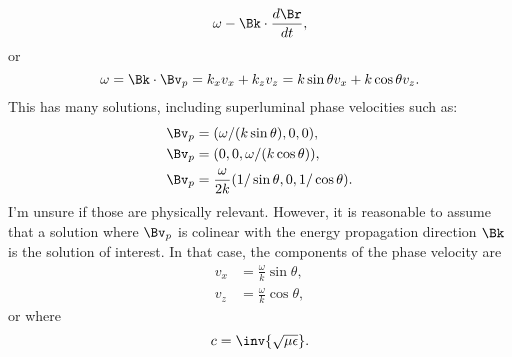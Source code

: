 {{\begin{dmath}
\omega - \Bk \cdot \frac{d\Br}{dt},
\end{dmath}
or
\begin{dmath}\label{eqn:emtproblemSet6Problem3:380}
\omega =
\Bk \cdot \Bv_p
=
k_x v_x
+
k_z v_z
=
k \sin\theta v_x
+
k \cos\theta v_z.
\end{dmath}
This has many solutions, including superluminal phase velocities such as:
\begin{equation}\label{eqn:emtproblemSet6Problem3:420}
\begin{aligned}
\Bv_p &= (\omega/(k\sin\theta), 0, 0), \\
\Bv_p &= (0, 0, \omega/(k\cos\theta)), \\
\Bv_p &= \frac{\omega}{2 k}(1/\sin\theta, 0, 1/\cos\theta).
\end{aligned}
\end{equation}
I'm unsure if those are physically relevant.  However,
it is reasonable to assume that a solution where \( \Bv_p \) is colinear with the energy propagation direction \( \Bk \) is the solution of interest.  In that case, the components of the phase velocity are
\begin{equation}\label{eqn:emtproblemSet6Problem3:320}
\begin{aligned}
v_x &= \frac{\omega}{k}\sin\theta, \\
v_z &= \frac{\omega}{k}\cos\theta,
\end{aligned}
\end{equation}
or
where
\begin{dmath}\label{eqn:emtproblemSet6Problem3:360}
c = \inv{\sqrt{\mu \epsilon}}.
\end{dmath}
}}
